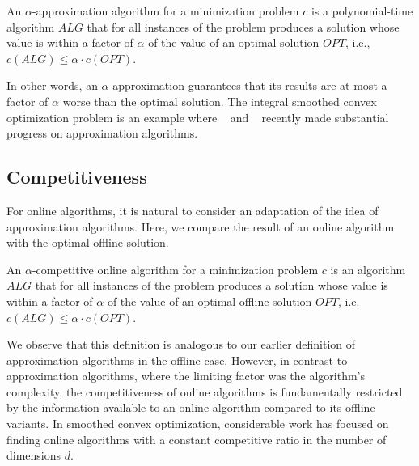 \begin{definition}
\cite{Williamson2011} An $\alpha$-approximation algorithm for a minimization problem $c$ is a polynomial-time algorithm $ALG$ that for all instances of the problem produces a solution whose value is within a factor of $\alpha$ of the value of an optimal solution $OPT$, i.e., $c(ALG) \leq \alpha \cdot c(OPT)$.
\end{definition}

In other words, an $\alpha$-approximation guarantees that its results are at most a factor of $\alpha$ worse than the optimal solution. The integral smoothed convex optimization problem is an example where \citeauthor*{Kappelmann2017}~\cite{Kappelmann2017} and \citeauthor*{Albers2021_2}~\cite{Albers2021_2} recently made substantial progress on approximation algorithms.

\subsection{Competitiveness}

For online algorithms, it is natural to consider an adaptation of the idea of approximation algorithms. Here, we compare the result of an online algorithm with the optimal offline solution.

\begin{definition}
An $\alpha$-competitive online algorithm for a minimization problem $c$ is an algorithm $ALG$ that for all instances of the problem produces a solution whose value is within a factor of $\alpha$ of the value of an optimal offline solution $OPT$, i.e. $c(ALG) \leq \alpha \cdot c(OPT)$.
\end{definition}

We observe that this definition is analogous to our earlier definition of approximation algorithms in the offline case. However, in contrast to approximation algorithms, where the limiting factor was the algorithm's complexity, the competitiveness of online algorithms is fundamentally restricted by the information available to an online algorithm compared to its offline variants. In smoothed convex optimization, considerable work has focused on finding online algorithms with a constant competitive ratio in the number of dimensions $d$.

